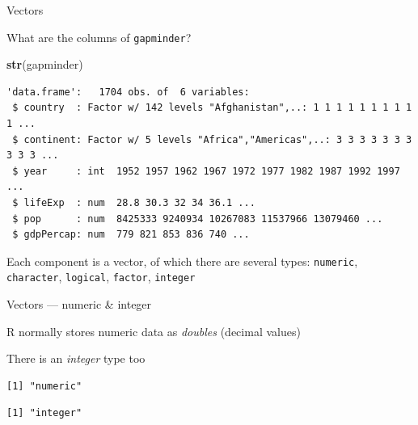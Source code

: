 \documentclass[10pt,ignorenonframetext,compress, aspectratio=169]{beamer}
\newenvironment{Shaded}{\begin{snugshade}}{\end{snugshade}}
\newcommand{\KeywordTok}[1]{\textcolor[rgb]{0.13,0.29,0.53}{\textbf{{#1}}}}
\newcommand{\NormalTok}[1]{{#1}}
\begin{document}
\begin{frame}[fragile]{Vectors}

What are the columns of \texttt{gapminder}?

\scriptsize

\begin{Shaded}
\begin{Highlighting}[]
\KeywordTok{str}\NormalTok{(gapminder)}
\end{Highlighting}
\end{Shaded}

\begin{verbatim}
'data.frame':   1704 obs. of  6 variables:
 $ country  : Factor w/ 142 levels "Afghanistan",..: 1 1 1 1 1 1 1 1 1 1 ...
 $ continent: Factor w/ 5 levels "Africa","Americas",..: 3 3 3 3 3 3 3 3 3 3 ...
 $ year     : int  1952 1957 1962 1967 1972 1977 1982 1987 1992 1997 ...
 $ lifeExp  : num  28.8 30.3 32 34 36.1 ...
 $ pop      : num  8425333 9240934 10267083 11537966 13079460 ...
 $ gdpPercap: num  779 821 853 836 740 ...
\end{verbatim}

\normalsize

Each component is a vector, of which there are several types:
\texttt{numeric}, \texttt{character}, \texttt{logical}, \texttt{factor},
\texttt{integer}

\end{frame}

\begin{frame}[fragile]{Vectors --- numeric \& integer}

R normally stores numeric data as \emph{doubles} (decimal values)

There is an \emph{integer} type too

\scriptsize

\begin{Shaded}
\end{Shaded}

\begin{verbatim}
[1] "numeric"
\end{verbatim}

\begin{Shaded}
\end{Shaded}

\begin{verbatim}
[1] "integer"
\end{verbatim}

\normalsize

\end{frame}
\end{document}
